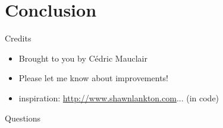 \section
  {Conclusion}

\begin{frame}
  {Credits}

  \begin{itemize}
  \item Brought to you by Cédric Mauclair
  \item Please let me know about improvements!
  \item inspiration: \url{http://www.shawnlankton.com}... (in code)
  \end{itemize}
\end{frame}


\begin{frame}
  {Questions}


\end{frame}

